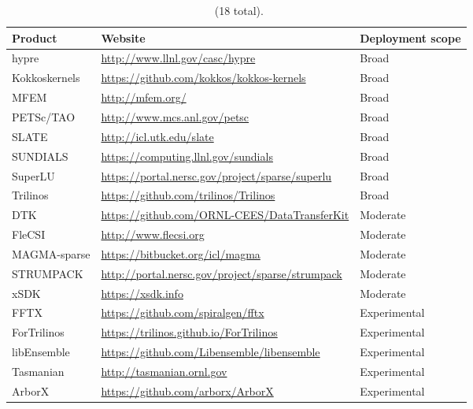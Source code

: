 \begin{table}[H]
\begin{tabularx}{\textwidth}{|l|X|l|}\hline
		\rowcolor{LightCyan}
	\textbf{Product} & \textbf{Website} & \textbf{Deployment scope}\\\hline
	hypre & \url{http://www.llnl.gov/casc/hypre} & Broad\\\hline
	Kokkoskernels & \url{https://github.com/kokkos/kokkos-kernels} & Broad\\\hline
	MFEM & \url{http://mfem.org/} & Broad\\\hline
	PETSc/TAO & \url{http://www.mcs.anl.gov/petsc} & Broad\\\hline
	SLATE & \url{http://icl.utk.edu/slate} & Broad\\\hline
	SUNDIALS & \url{https://computing.llnl.gov/sundials} & Broad\\\hline
	SuperLU & \url{https://portal.nersc.gov/project/sparse/superlu} & Broad\\\hline
	Trilinos & \url{https://github.com/trilinos/Trilinos} & Broad\\\hline

	DTK & \url{https://github.com/ORNL-CEES/DataTransferKit} & Moderate\\\hline
	FleCSI & \url{http://www.flecsi.org} & Moderate\\\hline
	MAGMA-sparse & \url{https://bitbucket.org/icl/magma} & Moderate\\\hline
	STRUMPACK & \url{http://portal.nersc.gov/project/sparse/strumpack} & Moderate\\\hline
	xSDK & \url{https://xsdk.info} & Moderate\\\hline

	FFTX & \url{https://github.com/spiralgen/fftx} & Experimental\\\hline
	ForTrilinos & \url{https://trilinos.github.io/ForTrilinos} & Experimental\\\hline
	libEnsemble & \url{https://github.com/Libensemble/libensemble} & Experimental\\\hline
	Tasmanian & \url{http://tasmanian.ornl.gov} & Experimental\\\hline
	ArborX & \url{https://github.com/arborx/ArborX} & Experimental\\\hline
\end{tabularx}
\caption{\label{table:math-products} \mathlibs~(18 total).}
\end{table}


